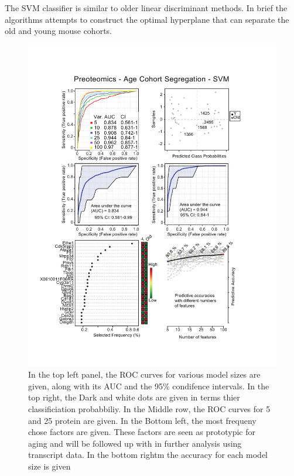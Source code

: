 \documentclass[a4paper,11pt,twoside]{book}
\begin{document}
	The SVM classifier is similar to older linear discriminant methods. In brief the algorithms attempts to construct the optimal hyperplane that can separate the old and young mouse cohorts\citep{Shawe-Taylor2011SVM}. 
	
	\begin{figure}[htb!]
		\centering
		\includegraphics[width=1.1\linewidth]{"3.Proteomics/Proteomics_Vingette_SVM_Age"}
		\caption[SVM Classifier for Young and Old Mice using Proteins]{In the top left panel, the ROC curves for various model sizes are given, along with its AUC and the 95\% condifence intervals. In the top right, the Dark and white dots are given in terms thier classificiation probabbiliy. In the Middle row, the ROC curves for 5 and 25 protein are given. In the Bottom left, the most frequeny chose factors are given. These factors are seen as prototypic for aging and will be followed up with in further analysis using transcript data. In the bottom rightm the accuracy for each model size is given}
		\label{fig:proteomicsvingettesvm}
	\end{figure}
	
\end{document}
